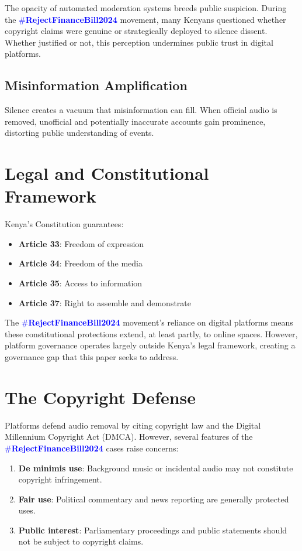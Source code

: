 \documentclass{article}
\newcommand{\rejectbill}{\textcolor{blue}{\#\textbf{RejectFinanceBill2024}}}
\begin{document}
The opacity of automated moderation systems breeds public suspicion. During the \rejectbill{} movement, many Kenyans questioned whether copyright claims were genuine or strategically deployed to silence dissent. Whether justified or not, this perception undermines public trust in digital platforms.

\subsection{Misinformation Amplification}

Silence creates a vacuum that misinformation can fill. When official audio is removed, unofficial and potentially inaccurate accounts gain prominence, distorting public understanding of events.

\section{Legal and Constitutional Framework}

Kenya's Constitution guarantees:

\begin{itemize}
\item \textbf{Article 33}: Freedom of expression
\item \textbf{Article 34}: Freedom of the media
\item \textbf{Article 35}: Access to information
\item \textbf{Article 37}: Right to assemble and demonstrate
\end{itemize}

The \rejectbill{} movement's reliance on digital platforms means these constitutional protections extend, at least partly, to online spaces. However, platform governance operates largely outside Kenya's legal framework, creating a governance gap that this paper seeks to address.

\section{The Copyright Defense}

Platforms defend audio removal by citing copyright law and the Digital Millennium Copyright Act (DMCA). However, several features of the \rejectbill{} cases raise concerns:

\begin{enumerate}
\item \textbf{De minimis use}: Background music or incidental audio may not constitute copyright infringement.
\item \textbf{Fair use}: Political commentary and news reporting are generally protected uses.
\item \textbf{Public interest}: Parliamentary proceedings and public statements should not be subject to copyright claims.
\end{enumerate}
\end{document}
